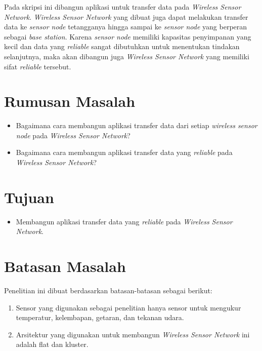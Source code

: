 Pada skripsi ini dibangun aplikasi untuk transfer data pada \textit{Wireless Sensor Network}. \textit{Wireless Sensor Network} yang dibuat juga dapat melakukan transfer data ke \textit{sensor node} tetangganya hingga sampai ke \textit{sensor node} yang berperan sebagai \textit{base station}. Karena \textit{sensor node} memiliki kapasitas penyimpanan yang kecil dan data yang \textit{reliable} sangat dibutuhkan untuk menentukan tindakan selanjutnya, maka akan dibangun juga \textit{Wireless Sensor Network} yang memiliki sifat \textit{reliable} tersebut.


\section{Rumusan Masalah}
\label{sec:rumusan}
\begin{itemize}
	\item Bagaimana cara membangun aplikasi transfer data dari setiap \textit{wireless sensor node} pada \textit{Wireless Sensor Network}?
	\item Bagaimana cara membangun aplikasi transfer data yang \textit{reliable} pada \textit{Wireless Sensor Network}?
\end{itemize}

\section{Tujuan}
\label{sec:tujuan}
\begin{itemize}
 \item Membangun aplikasi transfer data yang \textit{reliable} pada \textit{Wireless Sensor Network}.
\end{itemize}

\section{Batasan Masalah}
\label{sec:batasan}
Penelitian ini dibuat berdasarkan batasan-batasan sebagai berikut:
\begin{enumerate}
	\item Sensor yang digunakan sebagai penelitian hanya sensor untuk mengukur temperatur, kelembapan, getaran, dan tekanan udara.
	\item Arsitektur yang digunakan untuk membangun \textit{Wireless Sensor Network} ini adalah flat dan kluster.
\end{enumerate}

